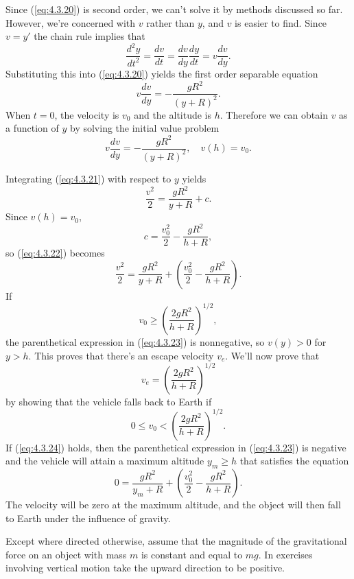 Since (\ref{eq:4.3.20}) is second order, we can't solve it by methods discussed so far. However,
we're concerned with $v$ rather than $y$, and $v$ is easier to find. Since $v=y'$ the chain rule
implies that
\[
  \frac{d^{2}y}{dt^{2}}=\frac{dv}{dt}=\frac{dv}{dy}\frac{dy}{dt}=v\frac{dv}{dy}.
\]
Substituting this into (\ref{eq:4.3.20}) yields the first order separable equation
\begin{equation}
  \label{eq:4.3.21}v\frac{dv}{dy}=-\frac{gR^{2}}{(y+R)^{2}}.
\end{equation}
When $t=0$, the velocity is $v_{0}$ and the altitude is $h$. Therefore we can obtain $v$ as a
function of $y$ by solving the initial value problem
\[
  v\frac{dv}{dy}=-\frac{gR^{2}}{(y+R)^{2}},\quad v(h)=v_{0}.
\]

Integrating (\ref{eq:4.3.21}) with respect to $y$ yields
\begin{equation}
  \label{eq:4.3.22}\frac{v^{2}}{2}=\frac{gR^{2}}{y+R}+c.
\end{equation}
Since $v(h)=v_{0}$,
\[
  c=\frac{v_{0}^{2}}{2}-\frac{gR^{2}}{h+R},
\]
so (\ref{eq:4.3.22}) becomes
\begin{equation}
  \label{eq:4.3.23}\frac{v^{2}}{2}=\frac{gR^{2}}{y+R}+\left(\frac{v_{0}^{2}}{2}- \frac{gR^{2}}{h+R}\right).
\end{equation}
If
\[
  v_{0}\ge\left(\frac{2gR^{2}}{h+R}\right)^{1/2},
\]
the parenthetical expression in (\ref{eq:4.3.23}) is nonnegative, so $v(y)>0$ for $y>h$. This proves
that there's an escape velocity $v_{e}$. We'll now prove that
\[
  v_{e}=\left(\frac{2gR^{2}}{h+R}\right)^{1/2}
\]
by showing that the vehicle falls back to Earth if
\begin{equation}
  \label{eq:4.3.24}0\le v_{0}<\left(\frac{2gR^{2}}{h+R}\right)^{1/2}.
\end{equation}
If (\ref{eq:4.3.24}) holds, then the parenthetical expression in (\ref{eq:4.3.23}) is negative and
the vehicle will attain a maximum altitude $y_{m}\ge h$ that satisfies the equation
\[
  0=\frac{gR^{2}}{y_{m}+R}+\left(\frac{v_{0}^{2}}{2}- \frac{gR^{2}}{h+R}\right).
\]
The velocity will be zero at the maximum altitude, and the object will then fall to Earth under the
influence of gravity.

\exercises Except where directed otherwise, assume that the magnitude of the gravitational force on an object with mass $m$ is constant and equal to $mg$. In exercises involving vertical motion take the upward direction to be positive.

